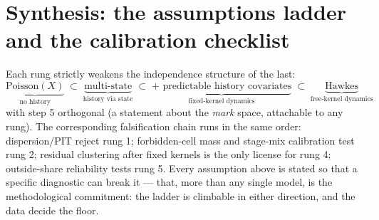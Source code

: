 \documentclass[11pt]{article}
\numberwithin{assumption}{section}
\numberwithin{proposition}{section}
\numberwithin{remark}{section}
\begin{document}
\section{Synthesis: the assumptions ladder and the calibration checklist}
\label{sec:synthesis}

Each rung strictly weakens the independence structure of the last:
\[
\underbrace{\text{Poisson}(X)}_{\text{no history}}
\;\subset\;
\underbrace{\text{multi-state}}_{\text{history via state}}
\;\subset\;
\underbrace{\text{+ predictable history covariates}}_{\text{fixed-kernel dynamics}}
\;\subset\;
\underbrace{\text{Hawkes}}_{\text{free-kernel dynamics}}
\]
with step 5 orthogonal (a statement about the \emph{mark} space, attachable
to any rung). The corresponding falsification chain runs in the same order:
dispersion/PIT reject rung 1; forbidden-cell mass and stage-mix
calibration test rung 2; residual clustering after fixed kernels is the
only license for rung 4; outside-share reliability tests rung 5. Every
assumption above is stated so that a specific diagnostic can break it ---
that, more than any single model, is the methodological commitment: the
ladder is climbable in either direction, and the data decide the floor.
\end{document}
